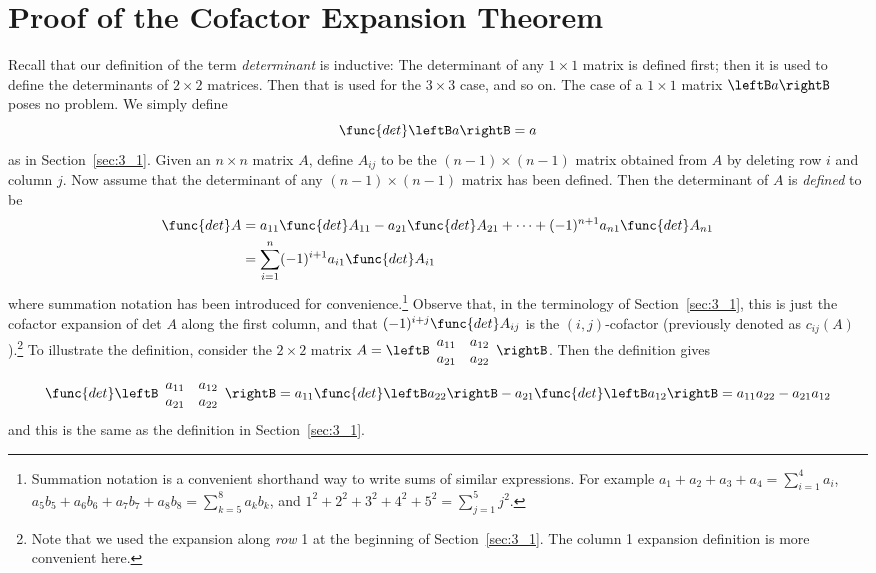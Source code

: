 \section{Proof of the Cofactor Expansion Theorem}
\label{sec:3_8}

Recall that our definition of the term \textit{determinant}
 is inductive: The determinant of any $1 \times 1$ matrix is defined first; 
then it is used to define the determinants of $2 \times 2$ matrices. Then that 
is used for the $3 \times 3$ case, and so on. The case of a $1 \times 1$ matrix $ \leftB a \rightB$ poses no problem. We simply define
\begin{equation*}
\func{det} \leftB a \rightB = a
\end{equation*}
as in Section~\ref{sec:3_1}. Given an $n \times n$ matrix $A$, define $A_{ij}$ to be the $(n - 1) \times (n - 1)$ matrix obtained from $A$ by deleting row $i$ and column $j$. Now assume that the determinant of any $(n - 1) \times (n - 1)$ matrix has been defined. Then the determinant of $A$ is \textit{defined} to be
\begin{align*}
\func{det } A & = a_{11} \func{det } A_{11} - a_{21} \func{det } A_{21} + \cdots + (-1)^{n+1} a_{n1} \func{det } A_{n1} \\
&= \sum_{i=1}^n (-1)^{i+1} a_{i1} \func{det }A_{i1}
\end{align*}
where summation notation has been introduced for convenience.\footnote{Summation notation is a convenient shorthand way to write sums of similar expressions. For example $a_1 +a_2 +a_3 +a_4 = \sum_{i=1}^4 a_i$, $a_5b_5 + a_6b_6 + a_7b_7 + a_8b_8 = \sum_{k=5}^8 a_kb_k$, and $1^2 +2^2 + 3^2+ 4^2 + 5^2 = \sum_{j=1}^5 j^2$.}
 Observe that, in the terminology of Section~\ref{sec:3_1}, this is just the cofactor expansion of det $A$ along the first column, and that $(-1)^{i+j} \func{det }A_{ij}$ is the $(i, j)$-cofactor (previously denoted as $c_{ij}(A)$).\footnote{Note that we used the expansion along \textit{row} 1 at the beginning of Section~\ref{sec:3_1}. The column 1 expansion definition is more convenient here.}
 To illustrate the definition, consider the $2 \times 2$ matrix $A = \leftB \begin{array}{cc}
a_{11} & a_{12} \\
a_{21} & a_{22}
\end{array}\rightB$. Then the definition gives
\begin{equation*}
\func{det}\leftB \begin{array}{cc}
a_{11} & a_{12} \\
a_{21} & a_{22}
\end{array}\rightB = a_{11} \func{det}\leftB a_{22} \rightB - a_{21} \func{det} \leftB a_{12} \rightB = a_{11} a_{22} - a_{21} a_{12}
\end{equation*}
and this is the same as the definition in Section~\ref{sec:3_1}.


